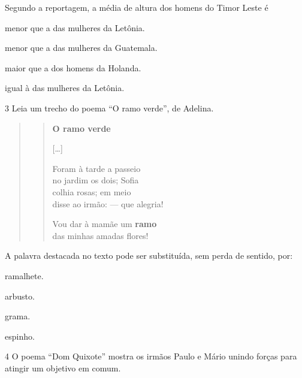 Segundo a reportagem, a média de altura dos homens do Timor Leste é

\begin{escolha}
\item menor que a das mulheres da Letônia.

\item menor que a das mulheres da Guatemala.

\item maior que a dos homens da Holanda.

\item igual à das mulheres da Letônia.
\end{escolha}


\num{3} Leia um trecho do poema ``O ramo verde'', de Adelina.

\begin{quote}
\begin{verse}
\textbf{O ramo verde}

{[}\ldots{}{]}

Foram à tarde a passeio\\
no jardim os dois; Sofia\\
colhia rosas; em meio\\
disse ao irmão: --- que alegria!

Vou dar à mamãe um \textbf{ramo}\\
das minhas amadas flores!
\end{verse}

\end{quote}

A palavra destacada no texto pode ser substituída, sem perda de sentido,
por:

\begin{escolha}
\item ramalhete.

\item arbusto.

\item grama.

\item espinho.
\end{escolha}

\num{4} O poema ``Dom Quixote'' mostra os irmãos Paulo e Mário unindo
forças para atingir um objetivo em comum.

